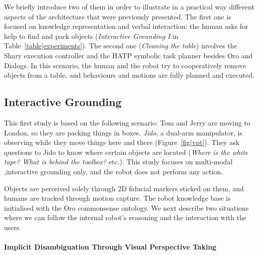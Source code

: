 \documentclass[preprint,3p,times]{elsarticle}
\begin{document}
We briefly introduce two of them in order to illustrate in a practical way
different aspects of the architecture that were previously presented.  The first
one is focused on knowledge representation and verbal interaction: the human
asks for help to find and pack objects ({\it Interactive Grounding I} in
Table~\ref{table|experiments}). The second one ({\it Cleaning the table})
involves the {\sc Shary} execution controller and the HATP symbolic task planner
besides {\sc Oro} and {\sc Dialogs}. In this scenario, the human and the robot
try to cooperatively remove objects from a table, and behaviours and motions are
fully planned and executed.

\subsection{Interactive Grounding}
\label{moving-london}

This first study is based on the following scenario: Tom and Jerry are moving to
London, so they are packing things in boxes. \emph{Jido}, a dual-arm
manipulator, is observing while they move things here and there
(Figure~\ref{fig|vpt}).  They ask questions to Jido to know where certain
objects are located (\emph{Where is the white tape? What is behind the toolbox?}
etc.). This study focuses on multi-modal ,interactive grounding only, and
the robot does not perform any action.

Objects are perceived solely through 2D fiducial markers sticked on them, and humans are
tracked through motion capture. The robot knowledge base is initialised with
the {\sc Oro} commonsense ontology.  We next describe two
situations where we can follow the internal robot's reasoning and the
interaction with the users.

\paragraph{Implicit Disambiguation Through Visual Perspective Taking}

\begin{figure}[!ht]
  \centering
\end{figure}
\end{document}
